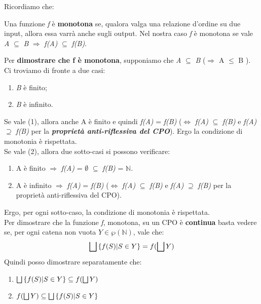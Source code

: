 {
    Ricordiamo che:
    \begin{mydef}
    Una funzione \textit{f} è \textbf{monotona} se, qualora valga una relazione
    d'ordine su due input, allora essa varrà anche sugli output. Nel nostra
    caso \textit{f} è monotona se vale \textit{A} $\subseteq$ \textit{B} 
    $\Rightarrow$ \textit{f(A)} $\subseteq$ \textit{f(B)}.
    \end{mydef}

    Per \textbf{dimostrare che f è monotona}, supponiamo che \textit{A} 
    $\subseteq$ \textit{B} ($\Rightarrow$ \textbar A\textbar{} $\leq$ \textbar B
    \textbar{}). Ci troviamo di fronte a due casi:
    \begin{enumerate}
        \item \textit{B} è finito;
        \item \textit{B} è infinito.
    \end{enumerate}

    Se vale (1), allora anche 
    \textbar A\textbar{} è finito e quindi \textit{f(A)} = \textit{f(B)} ($\iff$
    \textit{f(A)} $\subseteq$ \textit{f(B)} e \textit{f(A)} $\supseteq$ 
    \textit{f(B)} per la \textit{\textbf{proprietà anti-riflessiva del CPO}}).
    Ergo la condizione di monotonia è rispettata.\\

    Se vale (2), allora due sotto-casi si possono verificare:
    \begin{enumerate}
        \item A è finito $\Rightarrow$ \textit{f(A)} = $\emptyset$ $\subseteq$ 
        \textit{ f(B)} = $\mathbb{N}$.
        \item A è infinito $\Rightarrow$ \textit{f(A)} = \textit{f(B)} ($\iff$ 
        \textit{f(A)} $\subseteq$ \textit{f(B)} e \textit{f(A)} $\supseteq$ 
        \textit{f(B)} per la proprietà anti-riflessiva del CPO).
    \end{enumerate}

    Ergo, per ogni sotto-caso, la condizione di monotonia è rispettata.\\


    Per dimostrare che la funzione \textit{f}, monotona, su un CPO è 
    \textbf{continua} basta vedere se, per ogni catena non vuota 
    $Y\in\wp{(\mathbb{N})}$, vale che:
    \[\bigsqcup{} \{f(S) | S \in{}Y\} = f(\bigsqcup{}Y)\]
    Quindi posso dimostrare separatamente che:
    \begin{enumerate}
    \item $\bigsqcup{} \{f(S) | S \in{}Y\} \subseteq f(\bigsqcup{}Y)$
    \item $f(\bigsqcup{}Y) \subseteq \bigsqcup{} \{f(S) | S \in{}Y\}$
    \end{enumerate}

}
